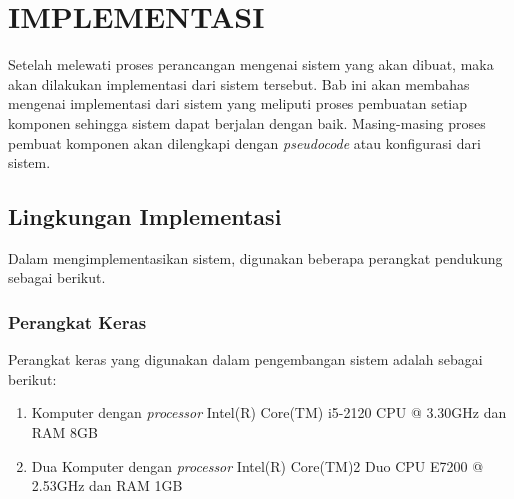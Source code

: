 \chapter{IMPLEMENTASI}
Setelah melewati proses perancangan mengenai sistem yang akan dibuat, maka akan dilakukan implementasi dari sistem tersebut. Bab ini akan membahas mengenai implementasi dari sistem yang meliputi proses pembuatan setiap komponen sehingga sistem dapat berjalan dengan baik. Masing-masing proses pembuat komponen akan dilengkapi dengan \textit{pseudocode} atau konfigurasi dari sistem.  
\section{Lingkungan Implementasi}
Dalam mengimplementasikan sistem, digunakan beberapa perangkat pendukung sebagai berikut.
\subsection{Perangkat Keras}
Perangkat keras yang digunakan dalam pengembangan sistem adalah sebagai berikut:
\begin{enumerate}
	\item Komputer dengan \textit{processor} Intel(R) Core(TM) i5-2120 CPU @ 3.30GHz dan RAM 8GB
	\item Dua Komputer dengan \textit{processor} Intel(R) Core(TM)2 Duo CPU E7200 @ 2.53GHz dan RAM 1GB
\end{enumerate}
